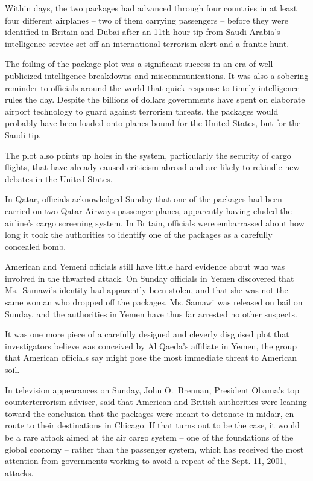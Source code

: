﻿\documentclass[12pt]{article}
\begin{document}
Within days, the two packages had advanced through four countries in at least four different
airplanes -- two of them carrying passengers -- before they were identified in Britain and Dubai
after an 11th-hour tip from Saudi Arabia's intelligence service set off an international terrorism
alert and a frantic hunt.

The foiling of the package plot was a significant success in an era of well-publicized intelligence
breakdowns and miscommunications. It was also a sobering reminder to officials around the world that
quick response to timely intelligence rules the day. Despite the billions of dollars governments
have spent on elaborate airport technology to guard against terrorism threats, the packages would
probably have been loaded onto planes bound for the United States, but for the Saudi tip.

The plot also points up holes in the system, particularly the security of cargo flights, that have
already caused criticism abroad and are likely to rekindle new debates in the United States.

In Qatar, officials acknowledged Sunday that one of the packages had been carried on two Qatar
Airways passenger planes, apparently having eluded the airline's cargo screening system. In Britain,
officials were embarrassed about how long it took the authorities to identify one of the packages as
a carefully concealed bomb.

American and Yemeni officials still have little hard evidence about who was involved in the thwarted
attack. On Sunday officials in Yemen discovered that Ms.~Samawi's identity had apparently been
stolen, and that she was not the same woman who dropped off the packages. Ms. Samawi was released on
bail on Sunday, and the authorities in Yemen have thus far arrested no other suspects.

It was one more piece of a carefully designed and cleverly disguised plot that investigators believe
was conceived by Al Qaeda's affiliate in Yemen, the group that American officials say might pose the
most immediate threat to American soil.

In television appearances on Sunday, John O.~Brennan, President Obama's top counterterrorism
adviser, said that American and British authorities were leaning toward the conclusion that the
packages were meant to detonate in midair, en route to their destinations in Chicago. If that turns
out to be the case, it would be a rare attack aimed at the air cargo system -- one of the
foundations of the global economy -- rather than the passenger system, which has received the most
attention from governments working to avoid a repeat of the Sept. 11, 2001, attacks.
\end{document}
